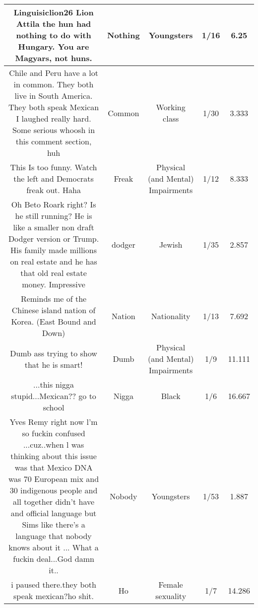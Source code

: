 \documentclass[11pt]{article}
\newlength\mylength
\begin{document}
\begin{center}
\begin{longtable}{|C{.40\mylength}|C{.30\mylength}|C{.15\mylength}|C{.15\mylength}|C{.15\mylength}|}
   Linguisiclion26 Lion Attila the hun had nothing to do with Hungary. You are Magyars, not huns.  & Nothing & Youngsters & 1/16 & 6.25 \\  \hline
   Chile and Peru have a lot in common. They both live in South America. They both speak Mexican  I laughed really hard.     Some serious whoosh in this comment section, huh  & Common & Working class & 1/30 & 3.333 \\  \hline
  This Is too funny. Watch the left and Democrats freak out. Haha  & Freak & Physical (and Mental) Impairments & 1/12 & 8.333 \\  \hline
  Oh Beto Roark right?  Is he still running? He is like a smaller non draft Dodger version or Trump.  His family made millions on real estate and he has that old real estate money.  Impressive  & dodger & Jewish & 1/35 & 2.857 \\  \hline
  Reminds me of the Chinese island nation of Korea.  (East Bound and Down)  & Nation & Nationality & 1/13 & 7.692 \\  \hline
  Dumb ass trying to show that he is smart!  & Dumb & Physical (and Mental) Impairments & 1/9 & 11.111 \\  \hline
  ...this nigga stupid...Mexican?? go to school  & Nigga & Black & 1/6 & 16.667 \\  \hline
   Yves Remy right now l'm so fuckin confused   ...cuz..when l was thinking about this issue was that Mexico DNA was 70  European mix and 30 indigenous people and all together didn't have and official language but Sims like there's a language that nobody knows about it ... What a fuckin deal...God damn it..  & Nobody & Youngsters & 1/53 & 1.887 \\  \hline
  i paused there.they both speak mexican?ho shit.  & Ho & Female sexuality & 1/7 & 14.286 \\  \hline

\end{longtable}
\end{center}
\end{document}
